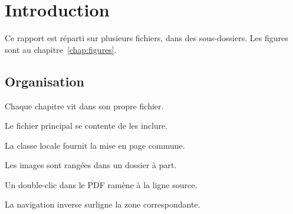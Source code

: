 \chapter{Introduction}\label{chap:intro}
Ce rapport est réparti sur plusieurs fichiers, dans des sous-dossiers.
Les figures sont au chapitre~\ref{chap:figures}.

\section{Organisation}\label{sec:organisation}
Chaque chapitre vit dans son propre fichier.

Le fichier principal se contente de les inclure.

La classe locale fournit la mise en page commune.

Les images sont rangées dans un dossier à part.

Un double-clic dans le PDF ramène à la ligne source.

La navigation inverse surligne la zone correspondante.
